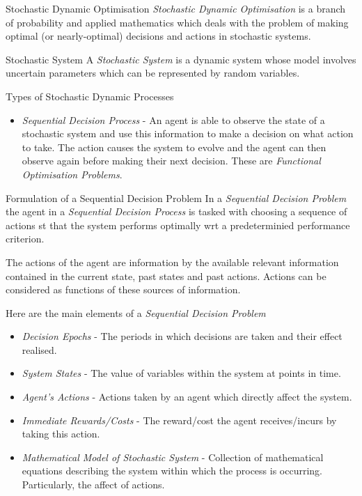 \documentclass[11pt,a4paper]{article}
\begin{document}
  \begin{definition}{Stochastic Dynamic Optimisation}
    \textit{Stochastic Dynamic Optimisation} is a branch of probability and applied mathematics which deals with the problem of making optimal (or nearly-optimal) decisions and actions in stochastic systems.
  \end{definition}

  \begin{definition}{Stochastic System}
    A \textit{Stochastic System} is a dynamic system whose model involves uncertain parameters which can be represented by random variables.
  \end{definition}

  \begin{definition}{Types of Stochastic Dynamic Processes}
    \begin{itemize}
      \item \textit{Sequential Decision Process} - An agent is able to observe the state of a stochastic system and use this information to make a decision on what action to take. The action causes the system to evolve and the agent can then observe again before making their next decision. These are \textit{Functional Optimisation Problems}.
    \end{itemize}
  \end{definition}

  \begin{proposition}{Formulation of a Sequential Decision Problem}
    In a \textit{Sequential Decision Problem} the agent in a \textit{Sequential Decision Process} is tasked with choosing a sequence of actions st that the system performs optimally wrt a predeterminied performance criterion.
    \par The actions of the agent are information by the available relevant information contained in the current state, past states and past actions. Actions can be considered as functions of these sources of information.
    \par Here are the main elements of a \textit{Sequential Decision Problem}
    \begin{itemize}
      \item \textit{Decision Epochs} - The periods in which decisions are taken and their effect realised.
      \item \textit{System States} - The value of variables within the system at points in time.
      \item \textit{Agent's Actions} - Actions taken by an agent which directly affect the system.
      \item \textit{Immediate Rewards/Costs} - The reward/cost the agent receives/incurs by taking this action.
      \item \textit{Mathematical Model of Stochastic System} - Collection of mathematical equations describing the system within which the process is occurring. Particularly, the affect of actions.
    \end{itemize}
  \end{proposition}
\end{document}
